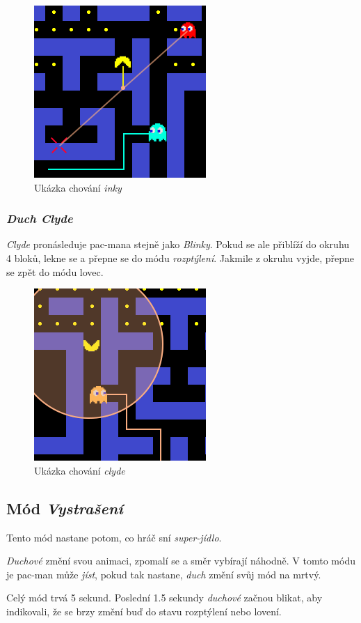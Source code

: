 \documentclass[czech]{pyt-report}
\begin{document}
\begin{figure}[h]
  \centering\leavevmode
  \includegraphics[width=.5\linewidth]{img/inky_ai.png}
  \caption{Ukázka chování \textit{inky}}
  \label{fig:par-y}
\end{figure}
\FloatBarrier
\subsubsection{\textit{Duch Clyde}}
\textit{Clyde} pronásleduje pac-mana stejně jako \textit{Blinky}. Pokud se ale přiblíží do okruhu 4 bloků, lekne se a přepne se do módu \textit{rozptýlení}. Jakmile z okruhu vyjde, přepne se zpět do módu lovec.

\begin{figure}[h]
  \centering\leavevmode
  \includegraphics[width=.5\linewidth]{img/clyde_ai.png}\vskip-0.5cm
  \caption{Ukázka chování \textit{clyde}}
  \label{fig:par-y}
\end{figure}
\FloatBarrier
\subsection{Mód \textit{Vystrašení}}
Tento mód nastane potom, co hráč sní \textit{super-jídlo}.\par
\textit{Duchové} změní svou animaci, zpomalí se a směr vybírají náhodně. V tomto módu je pac-man může \textit{jíst}, pokud tak nastane, \textit{duch} změní svůj mód na mrtvý.\par
Celý mód trvá 5 sekund. Poslední 1.5 sekundy \textit{duchové} začnou blikat, aby indikovali, že se brzy změní buď do stavu rozptýlení nebo lovení.
\end{document}
